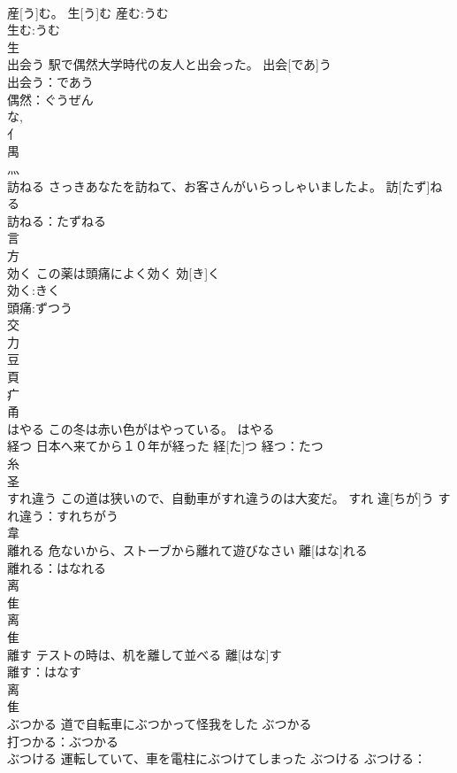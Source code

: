 \documentclass[8pt]{extreport}
\begin{document}
\begin{CJK}{UTF8}{min}
\\	産[う]む。 生[う]む			産む:うむ
\\	生む:うむ
\\	生 
\\	出会う	駅で偶然大学時代の友人と出会った。	出会[であ]う	
\\	出会う：であう
\\	偶然：ぐうぜん
\\	な, 
\\	亻 
\\	禺 
\\	灬 
\\	訪ねる	さっきあなたを訪ねて、お客さんがいらっしゃいましたよ。	訪[たず]ねる	
\\	訪ねる：たずねる
\\	言 
\\	方 
\\	効く	この薬は頭痛によく効く	効[き]く			
\\	効く:きく
\\	頭痛:ずつう
\\	交 
\\	力 
\\	豆 
\\	頁 
\\	疒 
\\	甬 
\\	はやる	この冬は赤い色がはやっている。	はやる			
\\	経つ	日本へ来てから１０年が経った	経[た]つ			経つ：たつ
\\	糸 
\\	圣 
\\	すれ違う	この道は狭いので、自動車がすれ違うのは大変だ。	すれ 違[ちが]う			すれ違う：すれちがう
\\	韋 
\\	離れる	危ないから、ストーブから離れて遊びなさい	離[はな]れる	
\\	離れる：はなれる
\\	离 
\\	隹 
\\	离 
\\	隹 
\\	離す	テストの時は、机を離して並べる	離[はな]す	
\\	離す：はなす
\\	离 
\\	隹 
\\	ぶつかる	道で自転車にぶつかって怪我をした	ぶつかる	
\\	打つかる：ぶつかる
\\	ぶつける	運転していて、車を電柱にぶつけてしまった	ぶつける			ぶつける：

\end{CJK}
\end{document}
